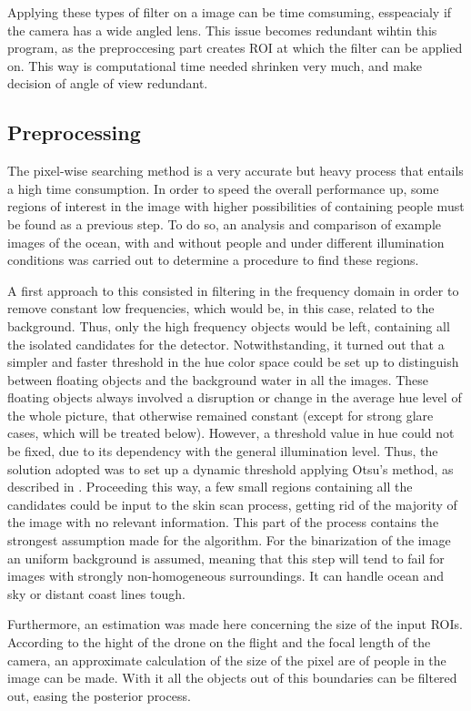 Applying these types of filter on a image can be time comsuming, esspeacialy if the camera has a wide angled lens.
This issue becomes redundant wihtin this program, as the preproccesing part creates ROI at which the filter can be applied on.
This way is computational time needed shrinken very much,  and make decision of angle of view redundant. \\


\subsection{Preprocessing}
The pixel-wise searching method is a very accurate but heavy process that entails a high time consumption.
In order to speed the overall performance up, some regions of interest in the image with higher possibilities
of containing people must be found as a previous step. 
To do so, an analysis and comparison of example images of the ocean, with and without people and under
different illumination conditions was carried out to determine a procedure to find these regions.

A first approach to this consisted in filtering in the frequency domain in order to remove constant low frequencies,
which would be, in this case, related to the background. Thus, only the high frequency objects would be left, containing all the isolated candidates for the detector.
Notwithstanding, it turned out that a simpler and faster threshold in the hue color space could be set up
to distinguish between floating objects and the background water in all the images. 
These floating objects always involved a disruption or change in the average hue level of the whole picture,
that otherwise remained constant (except for strong glare cases, which will be treated below).
However, a threshold value in hue could not be fixed, due to its dependency with the general illumination level. 
Thus, the solution adopted was to set up a dynamic threshold applying Otsu's method, as described in \cite{Ref:Otsu}.
Proceeding this way, a few small regions containing all the candidates could be input to the skin scan process,
getting rid of the majority of the image with no relevant information. 
This part of the process contains the strongest assumption made for the algorithm. 
For the binarization of the image an uniform background is assumed, meaning that this step will tend to fail for
images with strongly non-homogeneous surroundings. 
It can handle ocean and sky or distant coast lines tough. 

Furthermore, an estimation was made here concerning the size of the input ROIs. 
According to the hight of the drone on the flight and the focal length of the camera, an approximate calculation
of the size of the pixel are of people in the image can be made. 
With it all the objects out of this boundaries can be filtered out, easing the posterior process.

